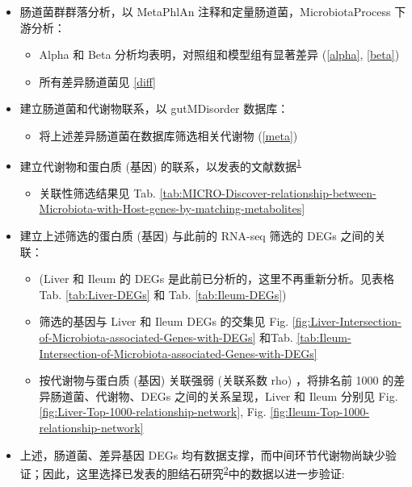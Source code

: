 \documentclass[
]{article}
\providecommand{\tightlist}{%
  \setlength{\itemsep}{0pt}\setlength{\parskip}{0pt}}
\begin{document}
\begin{itemize}
\tightlist
\item
  肠道菌群群落分析，以 MetaPhlAn 注释和定量肠道菌，MicrobiotaProcess 下游分析：

  \begin{itemize}
  \tightlist
  \item
    Alpha 和 Beta 分析均表明，对照组和模型组有显著差异 (\ref{alpha}, \ref{beta})
  \item
    所有差异肠道菌见 \ref{diff}
  \end{itemize}
\item
  建立肠道菌和代谢物联系，以 gutMDisorder 数据库：

  \begin{itemize}
  \tightlist
  \item
    将上述差异肠道菌在数据库筛选相关代谢物 (\ref{meta})
  \end{itemize}
\item
  建立代谢物和蛋白质 (基因) 的联系，以发表的文献数据\textsuperscript{\protect\hyperlink{ref-ProteinMetabolBenson2023}{1}}

  \begin{itemize}
  \tightlist
  \item
    关联性筛选结果见 Tab. \ref{tab:MICRO-Discover-relationship-between-Microbiota-with-Host-genes-by-matching-metabolites}
  \end{itemize}
\item
  建立上述筛选的蛋白质 (基因) 与此前的 RNA-seq 筛选的 DEGs 之间的关联：

  \begin{itemize}
  \tightlist
  \item
    (Liver 和 Ileum 的 DEGs 是此前已分析的，这里不再重新分析。见表格 Tab. \ref{tab:Liver-DEGs} 和 Tab. \ref{tab:Ileum-DEGs})
  \item
    筛选的基因与 Liver 和 Ileum DEGs 的交集见 Fig. \ref{fig:Liver-Intersection-of-Microbiota-associated-Genes-with-DEGs} 和Tab. \ref{tab:Ileum-Intersection-of-Microbiota-associated-Genes-with-DEGs}
  \item
    按代谢物与蛋白质 (基因) 关联强弱 (关联系数 rho) ，将排名前 1000 的差异肠道菌、代谢物、DEGs 之间的关系呈现，Liver 和 Ileum 分别见 Fig. \ref{fig:Liver-Top-1000-relationship-network}, Fig. \ref{fig:Ileum-Top-1000-relationship-network}
  \end{itemize}
\item
  上述，肠道菌、差异基因 DEGs 均有数据支撑，而中间环节代谢物尚缺少验证；因此，这里选择已发表的胆结石研究\textsuperscript{\protect\hyperlink{ref-ChangesAndCorChen2021}{2}}中的数据以进一步验证:


\end{itemize}
\end{document}
